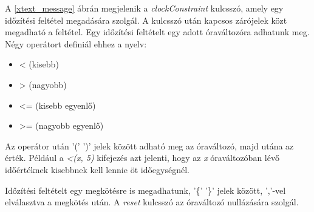 A \ref{xtext_message} ábrán megjelenik a \textit{clockConstraint} kulcsszó, amely egy időzítési feltétel megadására szolgál.
A kulcsszó után kapcsos zárójelek közt megadható a feltétel.
Egy időzítési feltételt egy adott óraváltozóra adhatunk meg.
Négy operátort definiál ehhez a nyelv:
\begin{itemize}
    \item < (kisebb)
    \item > (nagyobb)
    \item <= (kisebb egyenlő)
    \item >= (nagyobb egyenlő)
\end{itemize}
Az operátor után ’(’ ’)’ jelek között adható meg az óraváltozó, majd utána az érték.
Például a \textit{<(x, 5)} kifejezés azt jelenti, hogy az \textit{x} óraváltozóban lévő időértéknek kisebbnek kell lennie öt időegységnél.

Időzítési feltételt egy megkötésre is megadhatunk, '\{' '\}' jelek között, ’,’-vel elválasztva a megkötés után.
A \textit{reset} kulcsszó az óraváltozó nullázására szolgál.